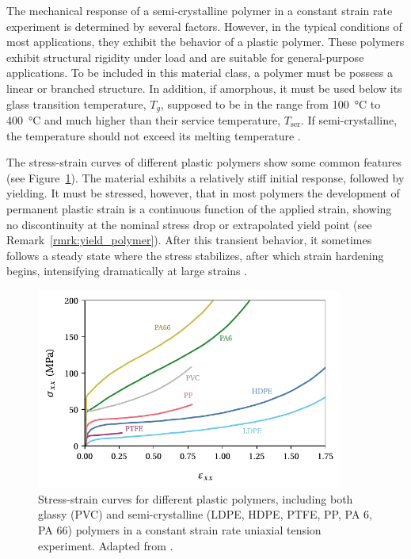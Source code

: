 The mechanical response of a semi-crystalline polymer in a constant strain rate experiment is determined by several factors.
However, in the typical conditions of most applications, they exhibit the behavior of a plastic polymer.
These polymers exhibit structural rigidity under load and are suitable for general-purpose applications.
To be included in this material class, a polymer must be possess a linear or branched structure.
In addition, if amorphous, it must be used below its glass transition temperature, $T_g$, supposed to be in the range from \SI{100}{\celsius} to \SI{400}{\celsius} and much higher than their service temperature, $T_\mathrm{ser}$.
If semi-crystalline, the temperature should not exceed its melting temperature \citep{callister2014materials, arzhakovRelaxationPhysicalMechanical2019}.


The stress-strain curves of different plastic polymers show some common features (see Figure~\ref{fig:response_plastic_polymer}).
The material exhibits a relatively stiff initial response, followed by yielding.
It must be stressed, however, that in most polymers the development of permanent plastic strain is a continuous function of the applied strain, showing no discontinuity at the nominal stress drop or extrapolated yield point \citep{wardReviewYieldBehaviour1971} (see Remark~\ref{rmrk:yield_polymer}).
After this transient behavior, it sometimes follows a steady state where the stress stabilizes, after which strain hardening begins, intensifying dramatically at large strains \citep{hissNetworkStretchingSlip1999,callister2014materials,makradiTwophaseSelfconsistentModel2005}.
\begin{figure}[hbp]
	\centering
	\includegraphics[width=0.9\textwidth]{figures/response_plastic_polymer}
	\caption{Stress-strain curves for different plastic polymers, including both glassy (PVC) and semi-crystalline (LDPE, HDPE, PTFE, PP, PA 6, PA 66) polymers in a constant strain rate uniaxial tension experiment. Adapted from \cite{gsellYieldTransientEffects1981}.}
\label{fig:response_plastic_polymer}
\end{figure}

